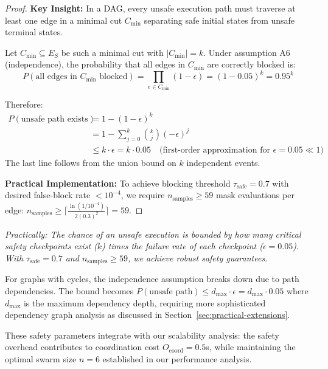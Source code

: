 \documentclass{article}
\begin{document}
\begin{proof}
\textbf{Key Insight:} In a DAG, every unsafe execution path must traverse at least one edge in a minimal cut $C_{\min}$ separating safe initial states from unsafe terminal states.

Let $C_{\min} \subseteq E_S$ be such a minimal cut with $|C_{\min}| = k$. Under assumption A6 (independence), the probability that all edges in $C_{\min}$ are correctly blocked is:
\begin{equation}
P(\text{all edges in } C_{\min} \text{ blocked}) = \prod_{e \in C_{\min}} (1-\epsilon) = (1-0.05)^k = 0.95^k
\end{equation}

Therefore:
\begin{align}
P(\text{unsafe path exists}) &= 1 - (1-\epsilon)^k \\
&= 1 - \sum_{j=0}^k \binom{k}{j}(-\epsilon)^j \\
&\leq k \cdot \epsilon = k \cdot 0.05 \quad \text{(first-order approximation for } \epsilon = 0.05 \ll 1\text{)}
\end{align}
The last line follows from the union bound on $k$ independent events.

\textbf{Practical Implementation:} To achieve blocking threshold $\tau_{\text{safe}} = 0.7$ with desired false-block rate $< 10^{-4}$, we require $n_{\text{samples}} \geq 59$ mask evaluations per edge: $n_{\text{samples}} \geq \lceil\frac{\ln(1/10^{-4})}{2(0.3)^2}\rceil = 59$.
\end{proof}

\textit{Practically: The chance of an unsafe execution is bounded by how many critical safety checkpoints exist ($k$) times the failure rate of each checkpoint ($\epsilon = 0.05$). With $\tau_{\text{safe}} = 0.7$ and $n_{\text{samples}} \geq 59$, we achieve robust safety guarantees.}

\begin{remark}
For graphs with cycles, the independence assumption breaks down due to path dependencies. The bound becomes $P(\text{unsafe path}) \leq d_{\max} \cdot \epsilon = d_{\max} \cdot 0.05$ where $d_{\max}$ is the maximum dependency depth, requiring more sophisticated dependency graph analysis as discussed in Section~\ref{sec:practical-extensions}.
\end{remark}

\begin{remark}
These safety parameters integrate with our scalability analysis: the safety overhead contributes to coordination cost $O_{\text{coord}} = 0.5$s, while maintaining the optimal swarm size $n = 6$ established in our performance analysis.
\end{remark}
\end{document}

